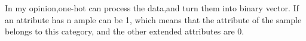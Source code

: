 \documentclass[a4paper,12pt]{article}
\begin{document}
In my opinion,one-hot can process the data,and turn them into binary vector.
    If an attribute has n ample can be 1, which means that the attribute of the
    sample belongs to this category, and the other extended attributes are 0.
\end{document}
